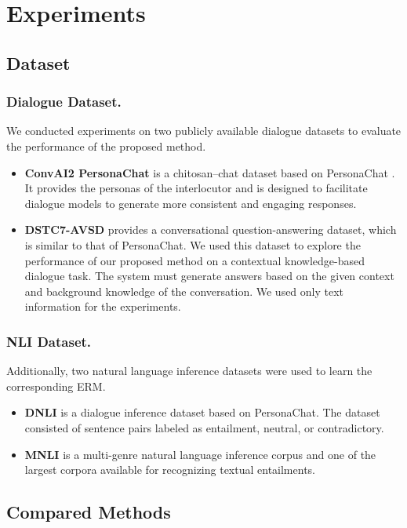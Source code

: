 \documentclass[letterpaper]{article} \usepackage{aaai23}  \usepackage{times}  \usepackage{helvet}  \usepackage{courier}  \usepackage[hyphens]{url}  \usepackage{graphicx} \urlstyle{rm} \def\UrlFont{\rm}  \usepackage{natbib}  \usepackage{caption} \frenchspacing  \setlength{\pdfpagewidth}{8.5in}  \setlength{\pdfpageheight}{11in}  \usepackage{algorithm}
\begin{document}
\section{Experiments}
\subsection{Dataset}
\subsubsection{Dialogue Dataset.}
We conducted experiments on two publicly available dialogue datasets to evaluate the performance of the proposed method. 
\begin{itemize}
    \item \textbf{ConvAI2 PersonaChat} \cite{Dinan2020} is a chitosan–chat dataset based on PersonaChat \cite{Zhang2018}. It provides the personas of the interlocutor and is designed to facilitate dialogue models to generate more consistent and engaging responses.
    \item \textbf{DSTC7-AVSD} \cite{Alamri2019} provides a conversational question-answering dataset, which is similar to that of PersonaChat. We used this dataset to explore the performance of our proposed method on a contextual knowledge-based dialogue task. The system must generate answers based on the given context and background knowledge of the conversation. We used only text information for the experiments.
\end{itemize}
\subsubsection{NLI Dataset.}
Additionally, two natural language inference datasets were used to learn the corresponding ERM.
\begin{itemize}
    \item \textbf{DNLI} \cite{Welleck2020} is a dialogue inference dataset based on PersonaChat. The dataset consisted of sentence pairs labeled as entailment, neutral, or contradictory.
    \item \textbf{MNLI} \cite{Williams2018} is a multi-genre natural language inference corpus and one of the largest corpora available for recognizing textual entailments.
\end{itemize}

\subsection{Compared Methods}
\end{document}
